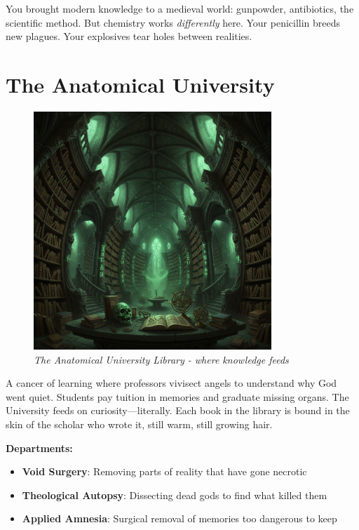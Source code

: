 \documentclass[11pt,a4paper,twoside]{book}
\begin{document}
You brought modern knowledge to a medieval world: gunpowder, antibiotics, the scientific method. But chemistry works \textit{differently} here. Your penicillin breeds new plagues. Your explosives tear holes between realities.

\section{The Anatomical University}

\begin{figure}[h]
\centering
\includegraphics[width=0.8\textwidth]{images/anatomical_university_library_2025-09-03T22-30-07-255Z_1.png}
\caption*{\textit{The Anatomical University Library - where knowledge feeds}}
\end{figure}

A cancer of learning where professors vivisect angels to understand why God went quiet. Students pay tuition in memories and graduate missing organs. The University feeds on curiosity—literally. Each book in the library is bound in the skin of the scholar who wrote it, still warm, still growing hair.

\textbf{Departments:}
\begin{itemize}
    \item \textbf{Void Surgery}: Removing parts of reality that have gone necrotic
    \item \textbf{Theological Autopsy}: Dissecting dead gods to find what killed them
    \item \textbf{Applied Amnesia}: Surgical removal of memories too dangerous to keep
\end{itemize}
\end{document}
